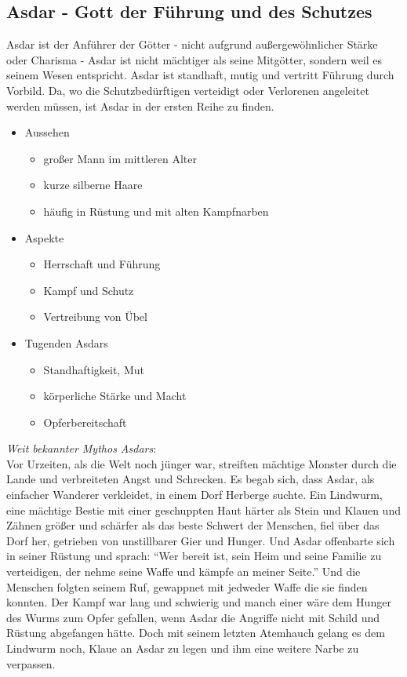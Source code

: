 \subsection{\textbf{Asdar} - Gott der Führung und des Schutzes}
Asdar ist der Anführer der Götter - nicht aufgrund außergewöhnlicher Stärke oder Charisma - Asdar ist nicht mächtiger als seine Mitgötter, sondern weil es seinem Wesen entspricht. Asdar ist standhaft, mutig und 
vertritt Führung durch Vorbild. Da, wo die Schutzbedürftigen verteidigt oder Verlorenen angeleitet werden müssen, ist Asdar in der ersten Reihe zu finden. \\
\begin{itemize}
	\item Aussehen 
	\begin{itemize}
		\item großer Mann im mittleren Alter
		\item kurze silberne Haare
		\item häufig in Rüstung und mit alten Kampfnarben
	\end{itemize}
	\item Aspekte
	\begin{itemize}
		\item Herrschaft und Führung
		\item Kampf und Schutz
		\item Vertreibung von Übel
	\end{itemize}
	\item Tugenden Asdars
	\begin{itemize}
		\item Standhaftigkeit, Mut
		\item körperliche Stärke und Macht
		\item Opferbereitschaft
	\end{itemize}
\end{itemize}
\textit{Weit bekannter Mythos Asdars}:\\
Vor Urzeiten, als die Welt noch jünger war, streiften mächtige Monster durch die Lande und verbreiteten Angst und Schrecken. Es begab sich, dass Asdar, als einfacher Wanderer 
verkleidet, in einem Dorf Herberge suchte. Ein Lindwurm, eine mächtige Bestie mit einer geschuppten Haut härter als Stein und Klauen und Zähnen größer und schärfer als das 
beste Schwert der Menschen, fiel über das Dorf her, getrieben von unstillbarer Gier und Hunger. Und Asdar offenbarte sich in seiner Rüstung und sprach: ``Wer bereit ist, sein Heim 
und seine Familie zu verteidigen, der nehme seine Waffe und kämpfe an meiner Seite.'' Und die Menschen folgten seinem Ruf, gewappnet mit jedweder Waffe die sie finden konnten. 
Der Kampf war lang und schwierig und manch einer wäre dem Hunger des Wurms zum Opfer gefallen, wenn Asdar die Angriffe nicht mit Schild und Rüstung abgefangen hätte. Doch 
mit seinem letzten Atemhauch gelang es dem Lindwurm noch, Klaue an Asdar zu legen und ihm eine weitere Narbe zu verpassen.\\~\\

